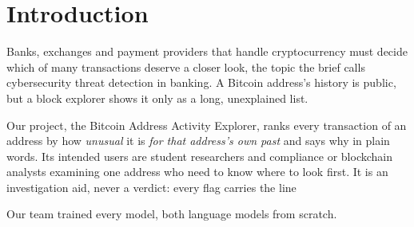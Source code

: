 \section{Introduction}
\label{sec:intro}

Banks, exchanges and payment providers that handle cryptocurrency must decide which of many transactions deserve
a closer look, the topic the brief calls cybersecurity threat detection in banking. A Bitcoin address's history is
public, but a block explorer shows it only as a long, unexplained list.

Our project, the Bitcoin Address Activity Explorer, ranks every transaction of an address by how \emph{unusual}
it is \emph{for that address's own past} and says why in plain words. Its intended users are student researchers
and compliance or blockchain analysts examining one address who need to know where to look first. It is an
investigation aid, never a verdict: every flag carries the line \limitation

Our team trained every model, both language models from scratch.
